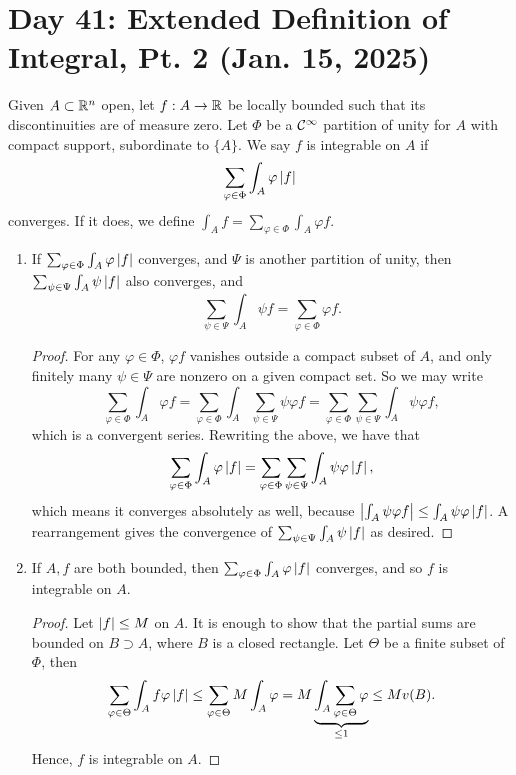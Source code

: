 \section{Day 41: Extended Definition of Integral, Pt. 2 (Jan. 15, 2025)}
Given $A \subset \mathbb R^n$ open, let $f : A \to \mathbb R$ be locally bounded such that its discontinuities are of measure zero. Let $\Phi$ be a $\mathcal C^\infty$ partition of unity for $A$ with compact support, subordinate to $\{A\}$. We say $f$ is integrable on $A$ if
\[ \sum_{\varphi \in \Phi} \int_A \varphi \left\lvert f \right\rvert \]
converges. If it does, we define $\int_A f = \sum_{\varphi \in \Phi} \int_A \varphi f$.
\begin{enumerate}[label=(\roman*)]
    \item If $\sum_{\varphi \in \Phi} \int_A \varphi \left\lvert f \right\rvert$ converges, and $\Psi$ is another partition of unity, then $\sum_{\psi \in \Psi} \int_A \psi \left\lvert f \right\rvert$ also converges, and
    \[ \sum_{\psi \in \Psi} \int_A \psi f = \sum_{\varphi \in \Phi} \varphi f. \]
    \begin{proof}
        For any $\varphi \in \Phi$, $\varphi f$ vanishes outside a compact subset of $A$, and only finitely many $\psi \in \Psi$ are nonzero on a given compact set. So we may write
        \[ \sum_{\varphi \in \Phi} \int_A \varphi f = \sum_{\varphi \in \Phi} \int_A \sum_{\psi \in \Psi} \psi \varphi f  = \sum_{\varphi \in \Phi} \sum_{\psi \in \Psi} \int_A \psi \varphi f, \]
        which is a convergent series. Rewriting the above, we have that
        \[ \sum_{\varphi \in \Phi} \int_A \varphi \left\lvert f \right\rvert = \sum_{\varphi \in \Phi} \sum_{\psi \in \Psi} \int_A \psi \varphi \left\lvert f \right\rvert, \]
        which means it converges absolutely as well, because $\left\lvert \int_A \psi \varphi f \right\rvert \leq \int_A \psi \varphi \left\lvert f \right\rvert$. A rearrangement gives the convergence of $\sum_{\psi \in \Psi} \int_A \psi \left\lvert f \right\rvert$ as desired.
    \end{proof}
    \item If $A, f$ are both bounded, then $\sum_{\varphi \in \Phi} \int_A \varphi \left\lvert f \right\rvert$ converges, and so $f$ is integrable on $A$.
    \begin{proof}
        Let $\left\lvert f \right\rvert \leq M$ on $A$. It is enough to show that the partial sums are bounded on $B \supset A$, where $B$ is a closed rectangle. Let $\Theta$ be a finite subset of $\Phi$, then
        \[ \sum_{\varphi \in \Theta} \int_A f \varphi \left\lvert f \right\rvert \leq \sum_{\varphi \in \Theta} M \int_A \varphi = M \underbrace{\int_A \sum_{\varphi \in \Theta} \varphi}_{\leq 1} \leq M v(B). \]
        Hence, $f$ is integrable on $A$.
    \end{proof}


\end{enumerate}
